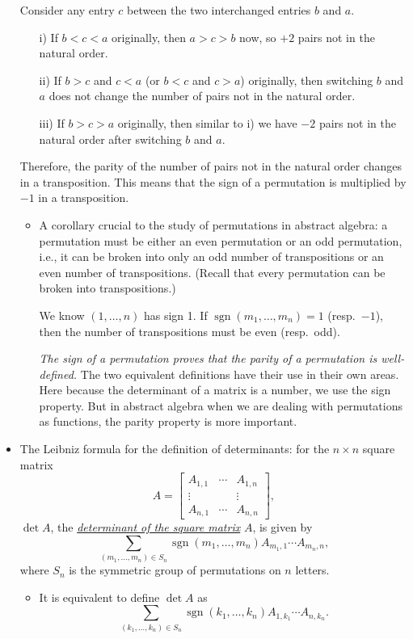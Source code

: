 \documentclass[11pt]{article}
\newcommand{\df}[1]{\ul{\textit{\textsf{#1}}}}
\newcommand{\sgn}{\operatorname{sgn}}
\begin{document}
\begin{itemize}
    Consider any entry $c$ between the two interchanged entries $b$ and $a$.
    \begin{enumerate}
        \item [i)] If $b < c < a$ originally, then $a > c > b$ now, so $+2$ pairs not in the natural order.
        \item [ii)] If $b > c$ and $c < a$ (or $b < c$ and $c > a$) originally, then switching $b$ and $a$ does not change the number of pairs not in the natural order.
        \item [iii)] If $b > c > a$ originally, then similar to i) we have $-2$ pairs not in the natural order after switching $b$ and $a$.
    \end{enumerate}
    Therefore, the parity of the number of pairs not in the natural order changes in a transposition. This means that the sign of a permutation is multiplied by $-1$ in a transposition.
    \begin{itemize}
        \item A corollary crucial to the study of permutations in abstract algebra: a permutation must be either an even permutation or an odd permutation, i.e., it can be broken into only an odd number of transpositions or an even number of transpositions. (Recall that every permutation can be broken into transpositions.)

        We know $(1,\dots,n)$ has sign 1. If $\sgn(m_1,\dots,m_n) = 1$ (resp.\ $-1$), then the number of transpositions must be even (resp.\ odd).

        \emph{The sign of a permutation proves that the parity of a permutation is well-defined.} The two equivalent definitions have their use in their own areas. Here because the determinant of a matrix is a number, we use the sign property. But in abstract algebra when we are dealing with permutations as functions, the parity property is more important.
    \end{itemize}
    \item The Leibniz formula for the definition of determinants: for the $n \times n$ square matrix \[A = \begin{bmatrix}
        A_{1,1} & \cdots & A_{1,n} \\ \vdots & & \vdots \\ A_{n,1} & \cdots & A_{n,n}
    \end{bmatrix},\] $\det A$, the \df{determinant of the square matrix} $A$, is given by \[\sum_{(m_1,\dots,m_n) \in S_n} \sgn (m_1,\dots,m_n) A_{m_1,1} \cdots A_{m_n,n},\] where $S_n$ is the symmetric group of permutations on $n$ letters.
    \begin{itemize}
        \item It is equivalent to define $\det A$ as \begin{equation}
            \sum_{(k_1,\dots,k_n) \in S_n} \sgn (k_1,\dots,k_n) A_{1,k_1} \cdots A_{n,k_n}.
        \end{equation}


\end{itemize}
\end{itemize}
\end{document}
